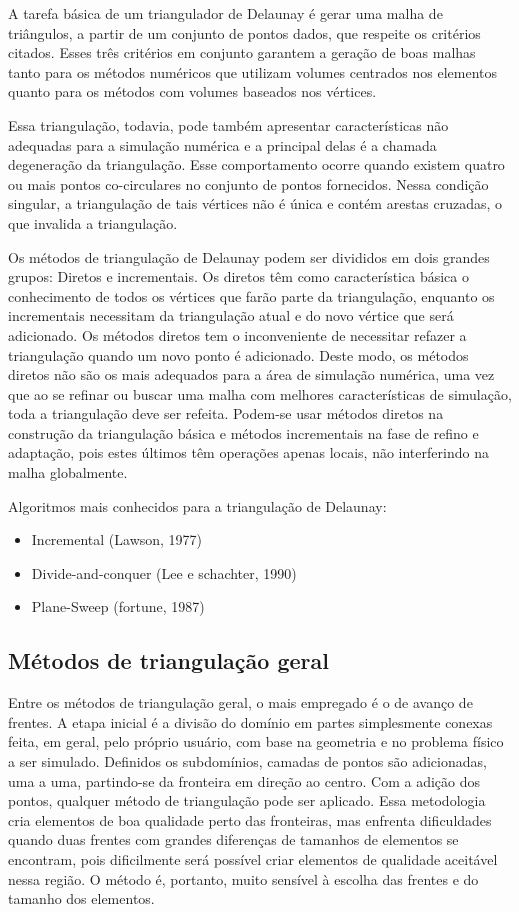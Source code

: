 A tarefa básica de um triangulador de Delaunay é gerar uma malha de triângulos, a partir de um conjunto de pontos dados, que respeite os critérios citados. Esses três critérios em conjunto garantem a geração de boas malhas tanto para os métodos numéricos que utilizam volumes centrados nos elementos quanto para os métodos com volumes baseados nos vértices.

Essa triangulação, todavia, pode também apresentar características não adequadas para a simulação numérica e a principal delas é a chamada degeneração da triangulação. Esse comportamento ocorre quando existem quatro ou mais pontos co-circulares no conjunto de pontos fornecidos. Nessa condição singular, a triangulação de tais vértices não é única e contém arestas cruzadas, o que invalida a triangulação.

Os métodos de triangulação de Delaunay podem ser divididos em dois grandes grupos: Diretos e incrementais. Os diretos têm como característica básica o conhecimento de todos os vértices que farão parte da triangulação, enquanto os incrementais necessitam da triangulação atual e do novo vértice que será adicionado. Os métodos diretos tem o inconveniente de necessitar refazer a triangulação quando um novo ponto é adicionado. Deste modo, os métodos diretos não são os mais adequados para a área de simulação numérica, uma vez que ao se refinar ou buscar uma malha com melhores características de simulação, toda a triangulação deve ser refeita. Podem-se usar métodos diretos na construção da triangulação básica e métodos incrementais na fase de refino e adaptação, pois estes últimos têm operações apenas locais, não interferindo na malha globalmente.

Algoritmos mais conhecidos para a triangulação de Delaunay:
\begin{itemize}
    \item Incremental (Lawson, 1977)
    \item Divide-and-conquer (Lee e schachter, 1990)
    \item Plane-Sweep (fortune, 1987)
\end{itemize}

\subsection{Métodos de triangulação geral}

Entre os métodos de triangulação geral, o mais empregado é o de avanço de frentes. A etapa inicial é a divisão do domínio em partes simplesmente conexas feita, em geral, pelo próprio usuário, com base na geometria e no problema físico a ser simulado. Definidos os subdomínios, camadas de pontos são adicionadas, uma a uma, partindo-se da fronteira em direção ao centro. Com a adição dos pontos, qualquer método de triangulação pode ser aplicado. Essa metodologia cria elementos de boa qualidade perto das fronteiras, mas enfrenta dificuldades quando duas frentes com grandes diferenças de tamanhos de elementos se encontram, pois dificilmente será possível criar elementos de qualidade aceitável nessa região. O método é, portanto, muito sensível à escolha das frentes e do tamanho dos elementos.

